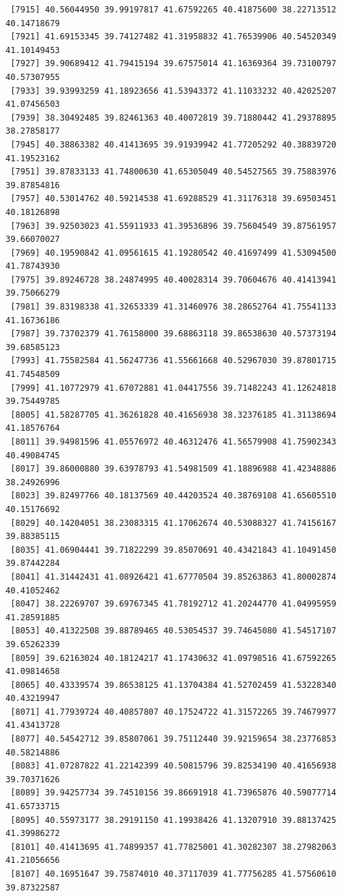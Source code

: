 \documentclass[
  letterpaper,
  DIV=11,
  numbers=noendperiod]{scrartcl}
\begin{document}
\begin{verbatim}
 [7915] 40.56044950 39.99197817 41.67592265 40.41875600 38.22713512 40.14718679
 [7921] 41.69153345 39.74127482 41.31958832 41.76539906 40.54520349 41.10149453
 [7927] 39.90689412 41.79415194 39.67575014 41.16369364 39.73100797 40.57307955
 [7933] 39.93993259 41.18923656 41.53943372 41.11033232 40.42025207 41.07456503
 [7939] 38.30492485 39.82461363 40.40072819 39.71880442 41.29378895 38.27858177
 [7945] 40.38863382 40.41413695 39.91939942 41.77205292 40.38839720 41.19523162
 [7951] 39.87833133 41.74800630 41.65305049 40.54527565 39.75883976 39.87854816
 [7957] 40.53014762 40.59214538 41.69288529 41.31176318 39.69503451 40.18126898
 [7963] 39.92503023 41.55911933 41.39536896 39.75604549 39.87561957 39.66070027
 [7969] 40.19590842 41.09561615 41.19280542 40.41697499 41.53094500 41.78743930
 [7975] 39.89246728 38.24874995 40.40028314 39.70604676 40.41413941 39.75066279
 [7981] 39.83198338 41.32653339 41.31460976 38.28652764 41.75541133 41.16736186
 [7987] 39.73702379 41.76158000 39.68863118 39.86538630 40.57373194 39.68585123
 [7993] 41.75582584 41.56247736 41.55661668 40.52967030 39.87801715 41.74548509
 [7999] 41.10772979 41.67072881 41.04417556 39.71482243 41.12624818 39.75449785
 [8005] 41.58287705 41.36261828 40.41656938 38.32376185 41.31138694 41.18576764
 [8011] 39.94981596 41.05576972 40.46312476 41.56579908 41.75902343 40.49084745
 [8017] 39.86000880 39.63978793 41.54981509 41.18896988 41.42348886 38.24926996
 [8023] 39.82497766 40.18137569 40.44203524 40.38769108 41.65605510 40.15176692
 [8029] 40.14204051 38.23083315 41.17062674 40.53088327 41.74156167 39.88385115
 [8035] 41.06904441 39.71822299 39.85070691 40.43421843 41.10491450 39.87442284
 [8041] 41.31442431 41.08926421 41.67770504 39.85263863 41.80002874 40.41052462
 [8047] 38.22269707 39.69767345 41.78192712 41.20244770 41.04995959 41.28591885
 [8053] 40.41322508 39.88789465 40.53054537 39.74645080 41.54517107 39.65262339
 [8059] 39.62163024 40.18124217 41.17430632 41.09798516 41.67592265 41.09814658
 [8065] 40.43339574 39.86538125 41.13704384 41.52702459 41.53228340 40.43219947
 [8071] 41.77939724 40.40857807 40.17524722 41.31572265 39.74679977 41.43413728
 [8077] 40.54542712 39.85807061 39.75112440 39.92159654 38.23776853 40.58214886
 [8083] 41.07287822 41.22142399 40.50815796 39.82534190 40.41656938 39.70371626
 [8089] 39.94257734 39.74510156 39.86691918 41.73965876 40.59077714 41.65733715
 [8095] 40.55973177 38.29191150 41.19938426 41.13207910 39.88137425 41.39986272
 [8101] 40.41413695 41.74899357 41.77825001 41.30282307 38.27982063 41.21056656
 [8107] 40.16951647 39.75874010 40.37117039 41.77756285 41.57560610 39.87322587

\end{verbatim}
\end{document}
